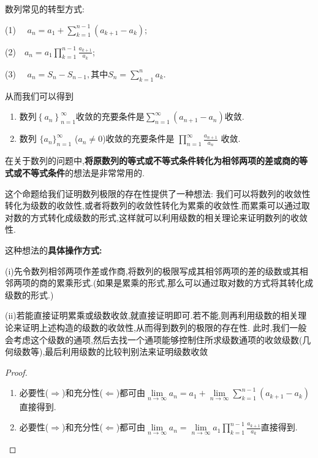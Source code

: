 \documentclass[../../main.tex]{subfiles}
\begin{document}
\begin{proposition}[数列常见的转型方式]\label{proposition:数列收敛的级数与累乘形式}
数列常见的转型方式:

(1) $\quad a_n = a_1 + \sum_{k=1}^{n-1} \left( a_{k+1} - a_k \right); $

(2)$ \quad a_n = a_1 \prod_{k=1}^{n-1} \frac{a_{k+1}}{a_k}$; 

(3) $\quad a_n = S_n - S_{n-1}, \text{其中} S_n = \sum_{k=1}^n a_k.$

从而我们可以得到
\begin{enumerate}
\item 数列$\left\{ a_n \right\} _{n=1}^{\infty}$收敛的充要条件是$\sum\limits_{n=1}^{\infty}{\left( a_{n+1}-a_n \right)}$收敛.

\item 数列 \(\{ a_n \}_{n = 1}^{\infty}\) (\(a_n\neq 0\))收敛的充要条件是 \(\prod_{n = 1}^{\infty} \frac{a_{n + 1}}{a_n}\) 收敛.
\end{enumerate}
\end{proposition}
\begin{remark}
在关于数列的问题中,\textbf{将原数列的等式或不等式条件转化为相邻两项的差或商的等式或不等式条件}的想法是非常常用的.
\end{remark}
\begin{note}
这个命题给我们证明数列极限的存在性提供了一种想法:
我们可以将数列的收敛性转化为级数的收敛性,或者将数列的收敛性转化为累乘的收敛性.而累乘可以通过取对数的方式转化成级数的形式,这样就可以利用级数的相关理论来证明数列的收敛性.

这种想法的\textbf{具体操作方式:}

(i)先令数列相邻两项作差或作商,将数列的极限写成其相邻两项的差的级数或其相邻两项的商的累乘形式.(如果是累乘的形式,那么可以通过取对数的方式将其转化成级数的形式.)

(ii)若能直接证明累乘或级数收敛,就直接证明即可.若不能,则再利用级数的相关理论来证明上述构造的级数的收敛性,从而得到数列的极限的存在性.
此时,我们一般会考虑这个级数的通项,然后去找一个通项能够控制住所求级数通项的收敛级数(几何级数等),最后利用级数的比较判别法来证明级数收敛
\end{note}
\begin{proof}
\begin{enumerate}
\item 必要性($\Rightarrow$)和充分性($\Leftarrow$)都可由$\underset{n\rightarrow \infty}{\lim}a_n=a_1+\underset{n\rightarrow \infty}{\lim}\sum_{k=1}^{n-1}{\left( a_{k+1}-a_k \right)}$直接得到.

\item 必要性($\Rightarrow$)和充分性($\Leftarrow$)都可由$\underset{n\rightarrow \infty}{\lim}a_n=\underset{n\rightarrow \infty}{\lim}a_1\prod_{k=1}^{n-1}{\frac{a_{k+1}}{a_k}}$直接得到.
\end{enumerate}
\end{proof}
\end{document}

